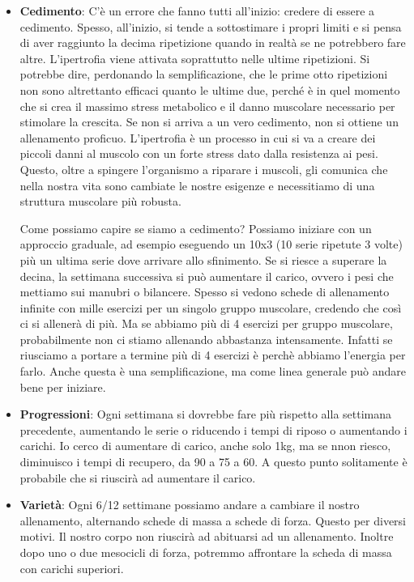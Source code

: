 \documentclass[12pt]{book} %
\begin{document}
\begin{itemize}
\item \textbf{Cedimento}:
C'è un errore che fanno tutti all'inizio: credere di essere a cedimento.
Spesso, all'inizio, si tende a sottostimare i propri limiti e si pensa di aver raggiunto la decima ripetizione quando in realtà se ne potrebbero fare altre.
L'ipertrofia viene attivata soprattutto nelle ultime ripetizioni. Si potrebbe dire, perdonando la semplificazione, che le prime otto ripetizioni non sono altrettanto efficaci quanto le ultime due, perché è in quel momento che si crea il massimo stress metabolico e il danno muscolare necessario per stimolare la crescita. Se non si arriva a un vero cedimento, non si ottiene un allenamento proficuo.
L'ipertrofia è un processo in cui si va a creare dei piccoli danni al muscolo con un forte stress dato dalla resistenza ai pesi. Questo, oltre a spingere l'organismo a riparare i muscoli, gli comunica che nella nostra vita sono cambiate le nostre esigenze e necessitiamo di una struttura muscolare più robusta.

Come possiamo capire se siamo a cedimento?
Possiamo iniziare con un approccio graduale, ad esempio eseguendo un 10x3 (10 serie ripetute 3 volte) più un ultima serie dove arrivare allo sfinimento. Se si riesce a superare la decina, la settimana successiva si può aumentare il carico, ovvero i pesi che mettiamo sui manubri o bilancere.
Spesso si vedono schede di allenamento infinite con mille esercizi per un singolo gruppo muscolare, credendo che così ci si allenerà di più. Ma se abbiamo più di 4 esercizi per gruppo muscolare, probabilmente non ci stiamo allenando abbastanza intensamente. Infatti se riusciamo a portare a termine più di 4 esercizi è perchè abbiamo l'energia per farlo. Anche questa è una semplificazione, ma come linea generale può andare bene per iniziare.

\item \textbf{Progressioni}:
Ogni settimana si dovrebbe fare più rispetto alla settimana precedente, aumentando le serie o riducendo i tempi di riposo o aumentando i carichi.
Io cerco di aumentare di carico, anche solo 1kg, ma se nnon riesco, diminuisco i tempi di recupero, da 90 a 75 a 60. A questo punto solitamente è probabile che si riuscirà ad aumentare il carico.

\item \textbf{Varietà}:
Ogni 6/12 settimane possiamo andare a cambiare il nostro allenamento, alternando schede di massa a schede di forza. Questo per diversi motivi. Il nostro corpo non riuscirà ad abituarsi ad un allenamento. Inoltre dopo uno o due mesocicli di forza, potremmo affrontare la scheda di massa con carichi superiori. 
\end{itemize}
\end{document}
